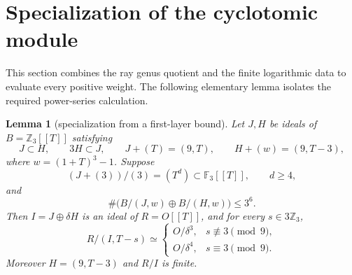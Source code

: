 \documentclass[11pt]{article}
\newtheorem{lemma}[theorem]{Lemma}
\theoremstyle{remark}\newtheorem{remark}[theorem]{Remark}
\newcommand{\Z}{\mathbb Z}\newcommand{\Q}{\mathbb Q}\newcommand{\F}{\mathbb F}
\begin{document}
\section{Specialization of the cyclotomic module}
This section combines the ray genus quotient and the finite logarithmic data to evaluate every positive weight.
The following elementary lemma isolates the required power-series calculation.

\begin{lemma}[specialization from a first-layer bound]
\label{lem:specialization}
Let $J,H$ be ideals of $B=\Z_3[[T]]$ satisfying
\[
 J\subset H,\qquad 3H\subset J,\qquad
 J+(T)=(9,T),\qquad H+(w)=(9,T-3),
\]
where $w=(1+T)^3-1$.
Suppose
\[
 (J+(3))/(3)=(T^d)\subset\F_3[[T]],\qquad d\geq4,
\]
and
\[
 \#\bigl(B/(J,w)\oplus B/(H,w)\bigr)\leq3^6.
\]
Then $I=J\oplus\delta H$ is an ideal of $R=O[[T]]$, and for every $s\in3\Z_3$,
\begin{equation}
 R/(I,T-s)\simeq
 \begin{cases}
 O/\delta^3,&s\not\equiv3\pmod9,\\
 O/\delta^4,&s\equiv3\pmod9.
 \end{cases}
 \label{eq:specialization}
\end{equation}
Moreover $H=(9,T-3)$ and $R/I$ is finite.
\end{lemma}
\end{document}
